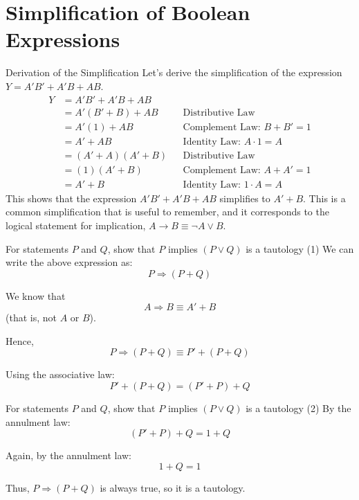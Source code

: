 \documentclass{beamer}
\begin{document}
\section{Simplification of Boolean Expressions}
\begin{frame}{Derivation of the Simplification}
    Let's derive the simplification of the expression $Y = A'B' + A'B + AB$.
    \begin{align*}
        Y &= A'B' + A'B + AB \\
          &= A'(B' + B) + AB && \text{Distributive Law} \\
          &= A'(1) + AB && \text{Complement Law: $B + B' = 1$} \\
          &= A' + AB && \text{Identity Law: $A \cdot 1 = A$} \\
          &= (A' + A)(A' + B) && \text{Distributive Law} \\
          &= (1)(A' + B) && \text{Complement Law: $A + A' = 1$} \\
          &= A' + B && \text{Identity Law: $1 \cdot A = A$}
    \end{align*}
    This shows that the expression $A'B' + A'B + AB$ simplifies to $A' + B$.
    This is a common simplification that is useful to remember, and it
    corresponds to the logical statement for implication, $A \rightarrow B
    \equiv \neg A \lor B$.
\end{frame}

\begin{frame}{For statements $P$ and $Q$, show that $P$ implies $(P \vee Q)$ is a tautology (1)}
We can write the above expression as: \[
P \Rightarrow (P + Q)
\]

We know that 
\[
A \Rightarrow B \equiv A' + B
\] 
(that is, not $A$ or $B$).  

Hence,
\[
P \Rightarrow (P + Q) \equiv P' + (P + Q)
\]

Using the associative law:
\[
P' + (P + Q) = (P' + P) + Q
\]
\end{frame}

\begin{frame}{For statements $P$ and $Q$, show that $P$ implies $(P \vee Q)$ is a tautology (2)}
By the annulment law:
\[
(P' + P) + Q = 1 + Q
\]

Again, by the annulment law:
\[
1 + Q = 1
\]

\alert{Thus, $P \Rightarrow (P + Q)$ is always true, so it is a tautology.}
\end{frame}
\end{document}
